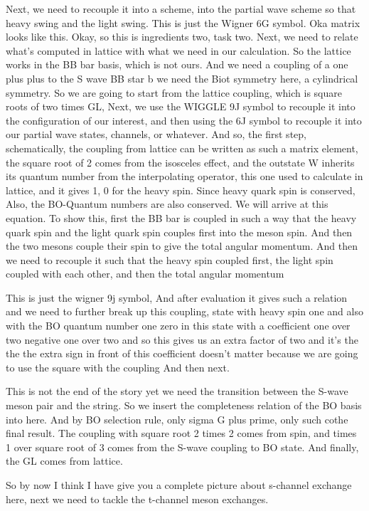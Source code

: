 \documentclass[11pt]{article}
\begin{document}
Next, we need to recouple it into a scheme, into the partial wave scheme so that heavy swing and the light swing. This is just the Wigner 6G symbol. Oka matrix looks like this. Okay, so this is ingredients two, task two. Next, we need to relate what's computed in lattice with what we need in our calculation. So the lattice works in the BB bar basis, which is not ours. And we need a coupling of a one plus plus to the S wave BB star b we need the Biot symmetry here, a cylindrical symmetry. So we are going to start from the lattice coupling, which is square roots of two times GL, Next, we use the WIGGLE 9J symbol to recouple it into the configuration of our interest, and then using the 6J symbol to recouple it into our partial wave states, channels, or whatever. And so, the first step, schematically, the coupling from lattice can be written as such a matrix element, the square root of 2 comes from the isosceles effect, and the outstate W inherits its quantum number from the interpolating operator, this one used to calculate in lattice, and it gives 1, 0 for the heavy spin. Since heavy quark spin is conserved, Also, the BO-Quantum numbers are also conserved. We will arrive at this equation. To show this, first the BB bar is coupled in such a way that the heavy quark spin and the light quark spin couples first into the meson spin. And then the two mesons couple their spin to give the total angular momentum. And then we need to recouple it such that the heavy spin coupled first, the light spin coupled with each other, and then the total angular momentum

This is just the wigner 9j symbol, And after evaluation it gives such a relation and we need to further break up this coupling, state with heavy spin one and also with the BO quantum number one zero in this state with a coefficient one over two negative one over two and so this gives us an extra factor of two and it's the the the extra sign in front of this coefficient doesn't matter because we are going to use the square with the coupling And then next.

This is not the end of the story yet we need the transition between the S-wave meson pair and the string. So we insert the completeness relation of the BO basis into here. And by BO selection rule, only sigma G plus prime, only such cothe final result. The coupling with square root 2 times 2 comes from spin, and times 1 over square root of 3 comes from the S-wave coupling to BO state. And finally, the GL comes from lattice.

So by now I think I have give you a complete picture about s-channel exchange here, next we need to tackle the t-channel meson exchanges.
\end{document}
